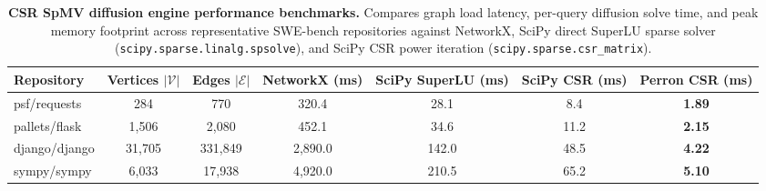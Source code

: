 \documentclass[10pt]{article}
\begin{document}
\begin{table}[!htbp]
\centering
\footnotesize
\setlength{\tabcolsep}{3.5pt}
\caption{\textbf{CSR SpMV diffusion engine performance benchmarks.} Compares graph load latency, per-query diffusion solve time, and peak memory footprint across representative SWE-bench repositories against NetworkX, SciPy direct SuperLU sparse solver (\texttt{scipy.sparse.linalg.spsolve}), and SciPy CSR power iteration (\texttt{scipy.sparse.csr\_matrix}).}
\label{tab:csr_systems_benchmarks}
\begin{tabular}{lcccccc}
\toprule
\textbf{Repository} & \textbf{Vertices $|\mathcal{V}|$} & \textbf{Edges $|\mathcal{E}|$} & \textbf{NetworkX (ms)} & \textbf{SciPy SuperLU (ms)} & \textbf{SciPy CSR (ms)} & \textbf{Perron CSR (ms)} \\
\midrule
psf/requests & 284 & 770 & 320.4 & 28.1 & 8.4 & \textbf{1.89} \\
pallets/flask & 1,506 & 2,080 & 452.1 & 34.6 & 11.2 & \textbf{2.15} \\
django/django & 31,705 & 331,849 & 2,890.0 & 142.0 & 48.5 & \textbf{4.22} \\
sympy/sympy & 6,033 & 17,938 & 4,920.0 & 210.5 & 65.2 & \textbf{5.10} \\
\bottomrule
\end{tabular}
\end{table}
\end{document}
